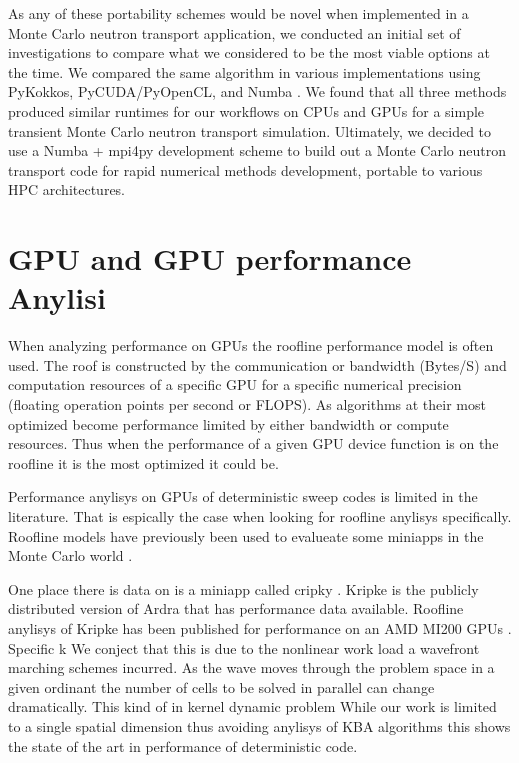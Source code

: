 
As any of these portability schemes would be novel when implemented in a Monte Carlo neutron transport application, we conducted an initial set of investigations to compare what we considered to be the most viable options at the time. 
We compared the same algorithm in various implementations using PyKokkos, PyCUDA/PyOpenCL, and Numba \cite{morgan2022}.
We found that all three methods produced similar runtimes for our workflows on CPUs and GPUs for a simple transient Monte Carlo neutron transport simulation.
Ultimately, we decided to use a Numba + mpi4py development scheme to build out a Monte Carlo neutron transport code for rapid numerical methods development, portable to various HPC architectures.

\section{GPU and GPU performance Anylisi}
When analyzing performance on GPUs the roofline performance model is often used.
The roof is constructed by the communication or bandwidth (Bytes/S) and computation resources of a specific GPU for a specific numerical precision (floating operation points per second or FLOPS).
As algorithms at their most optimized become performance limited by either bandwidth or compute resources.
Thus when the performance of a given GPU device function is on the roofline it is the most optimized it could be.

Performance anylisys on GPUs of deterministic sweep codes is limited in the literature. 
That is espically the case when looking for roofline anylisys specifically.
Roofline models have previously been used to evalueate some miniapps in the Monte Carlo world \citep{tramm2021domain, tramm2022roofline}.

One place there is data on is a miniapp called cripky \citep{kunen_kripke_2015}.
Kripke is the publicly distributed version of Ardra that has performance data available.
Roofline anylisys of Kripke has been published for performance on an AMD MI200 GPUs \citep{wolfe2022roofline}. 
Specific k
We conject that this is due to the nonlinear work load a wavefront marching schemes incurred. 
As the wave moves through the problem space in a given ordinant the number of cells to be solved in parallel can change dramatically.
This kind of in kernel dynamic problem 
While our work is limited to a single spatial dimension thus avoiding anylisys of KBA algorithms this shows the state of the art in performance of deterministic code.


\label{ch-intro}